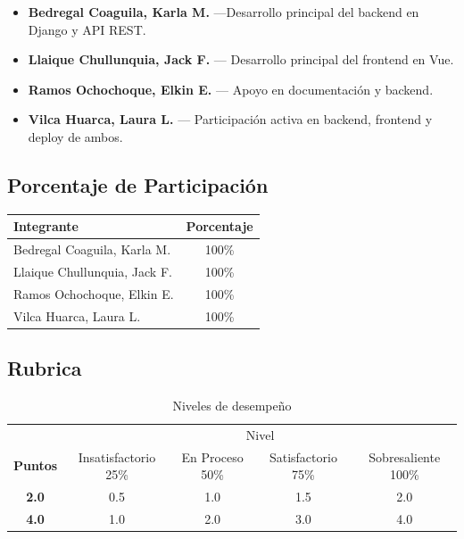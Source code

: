 \documentclass{article}
\begin{document}
\begin{itemize}
    \item \textbf{Bedregal Coaguila, Karla M.} —Desarrollo principal del backend en Django y API REST.
    \item \textbf{Llaique Chullunquia, Jack F.} — Desarrollo principal del frontend en Vue.
    \item \textbf{Ramos Ochochoque, Elkin E.} — Apoyo en documentación y backend.
    \item \textbf{Vilca Huarca, Laura L.} — Participación activa en backend, frontend y deploy de ambos.
\end{itemize}

    \subsection{Porcentaje de Participación}

\begin{center}
\begin{tabular}{|l|c|}
\hline
\textbf{Integrante} & \textbf{Porcentaje} \\
\hline
Bedregal Coaguila, Karla M. & 100\% \\
Llaique Chullunquia, Jack F. & 100\% \\
Ramos Ochochoque, Elkin E. & 100\% \\
Vilca Huarca, Laura L. & 100\% \\
\hline
\end{tabular}
\end{center}

    \subsection{Rubrica}
        \begin{table}[ht]
			\caption{Niveles de desempeño}
			\begin{center}
			\begin{tabular}{ccccc}
    			\hline
    			 & \multicolumn{4}{c}{Nivel}\\
    			\cline{1-5}
    			\textbf{Puntos} & Insatisfactorio 25\%& En Proceso 50\% & Satisfactorio 75\% & Sobresaliente 100\%\\
    			\textbf{2.0}&0.5&1.0&1.5&2.0\\
    			\textbf{4.0}&1.0&2.0&3.0&4.0\\
    		    \hline
			    \end{tabular}
		    \end{center}
	    \end{table}
\end{document}
